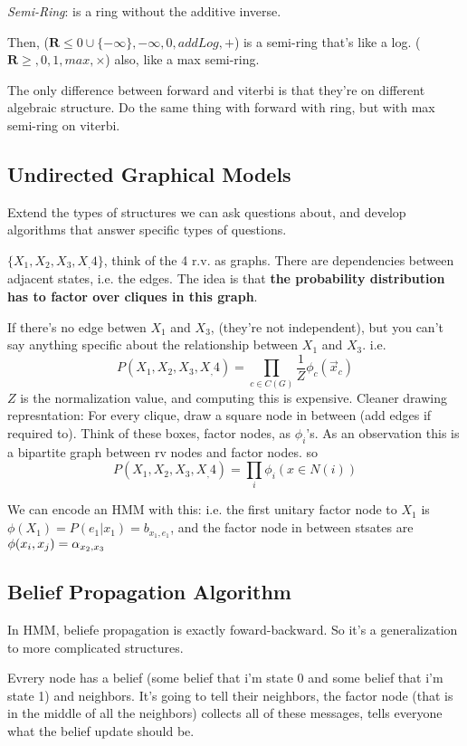 \emph{Semi-Ring}: is a ring without the additive inverse.

Then, ($\mathbf{R} \le 0 \cup \{-\infty\}, -\infty, 0, addLog ,+$) is
a semi-ring that's like a log. ($\mathbf{R}\ge, 0, 1, max, \times$)
also, like a max semi-ring.

The only difference between forward and viterbi is that they're on
different algebraic structure. Do the same thing with forward with
ring, but with max semi-ring on viterbi.

\subsection{Undirected Graphical Models}
Extend the types of structures we can ask questions about, and develop
algorithms that answer specific types of questions.

$\{X_1,X_2,X_3,X_,4\}$, think of the 4 r.v. as graphs. There are
dependencies between adjacent states, i.e. the edges. The idea is that
\textbf{the probability distribution has to factor over cliques in
  this graph}.

If there's no edge betwen $X_1$ and $X_3$, (they're not independent),
but you can't say anything specific about the relationship between
$X_1$ and $X_3$. i.e. $$P(X_1,X_2,X_3,X_,4)= \prod_{c\in C(G)}\frac{1}{Z}\phi_c(\vec
x_c)$$
$Z$ is the normalization value, and computing this is expensive.
Cleaner drawing represntation: For every clique, draw a square node in
between (add edges if required to). Think of these boxes, factor
nodes, as $\phi_i$'s. As an observation this is a bipartite graph between rv
nodes and factor nodes. so
$$P(X_1,X_2,X_3,X_,4) = \prod_i \phi_i(x\in N(i))$$

We can encode an HMM with this: i.e. the first unitary factor node to $X_1$
is $\phi(X_1) = P(e_1|x_1) = b_{x_1,
  e_1}$,  and the factor node in between stsates are $\phi(x_i,x_j) = \alpha_{x_2,x_3}$

\subsection{Belief Propagation Algorithm}
In HMM, beliefe propagation is exactly foward-backward. So it's a
generalization to more complicated structures.

Evrery node has a belief (some belief that i'm state 0 and some belief
that i'm state 1) and neighbors. It's going to tell their
neighbors, the factor node (that is in the middle of all the
neighbors) collects all of these messages, tells everyone what the
belief update should be.

